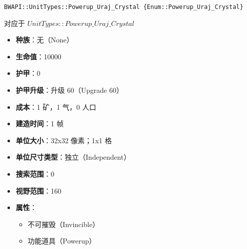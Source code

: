 \begin{tcolorbox}[colback=white, colframe=black!60!white, title=Powerup\_Uraj\_Crystal(), arc=0mm]
    \begin{verbatim}
BWAPI::UnitTypes::Powerup_Uraj_Crystal {Enum::Powerup_Uraj_Crystal}
    \end{verbatim}
    对应于  $UnitTypes::Powerup\_Uraj\_Crystal$ 
    \begin{itemize}
        \item \textbf{种族}：无（None）
        \item \textbf{生命值}：10000
        \item \textbf{护甲}：0
        \item \textbf{护甲升级}：升级 60（Upgrade 60）
        \item \textbf{成本}：1 矿，1 气，0 人口
        \item \textbf{建造时间}：1 帧
        \item \textbf{单位大小}：32x32 像素；1x1 格
        \item \textbf{单位尺寸类型}：独立（Independent）
        \item \textbf{搜索范围}：0
        \item \textbf{视野范围}：160
        \item \textbf{属性}：
            \begin{itemize}
                \item 不可摧毁（Invincible）
                \item 功能道具（Powerup）
            \end{itemize}
    \end{itemize}
\end{tcolorbox}

